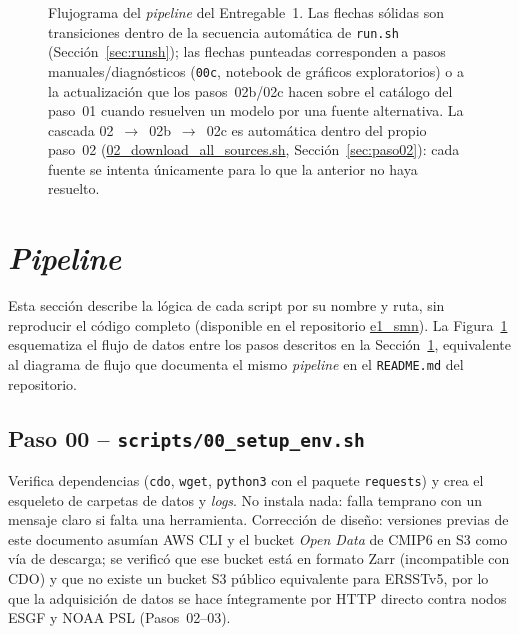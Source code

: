 \documentclass[11pt,a4paper]{article}
\newcommand{\archivo}[1]{\begingroup\hypersetup{urlcolor=black}\url{#1}\endgroup}
\begin{document}
\begin{figure}[htbp]
\begin{tikzpicture}
\end{tikzpicture}
\caption[Flujograma del \emph{pipeline} del Entregable~1.]{Flujograma del \emph{pipeline} del Entregable~1. Las flechas s\'olidas son transiciones dentro de la secuencia autom\'atica de \texttt{run.sh} (Secci\'on~\ref{sec:runsh}); las flechas punteadas corresponden a pasos manuales/diagn\'osticos (\texttt{00c}, notebook de gr\'aficos exploratorios) o a la actualizaci\'on que los pasos~02b/02c hacen sobre el cat\'alogo del paso~01 cuando resuelven un modelo por una fuente alternativa. La cascada 02~$\to$~02b~$\to$~02c es autom\'atica dentro del propio paso~02 (\archivo{02_download_all_sources.sh}, Secci\'on~\ref{sec:paso02}): cada fuente se intenta \'unicamente para lo que la anterior no haya resuelto.}
\label{fig:flujograma}
\end{figure}

\section{\emph{Pipeline}}
\label{sec:scripts}

Esta secci\'on describe la l\'ogica de cada script por su nombre y ruta, sin reproducir el c\'odigo completo (disponible en el repositorio \archivo{e1_smn}).
La Figura~\ref{fig:flujograma} esquematiza el flujo de datos entre los pasos descritos en la Secci\'on~\ref{sec:scripts}, equivalente al diagrama de flujo que documenta el mismo \emph{pipeline} en el \texttt{README.md} del repositorio.


\subsection{Paso 00 -- \texttt{scripts/00\_setup\_env.sh}}
Verifica dependencias (\texttt{cdo}, \texttt{wget}, \texttt{python3} con el paquete \texttt{requests}) y crea el esqueleto de carpetas de datos y \emph{logs}. No instala nada: falla temprano con un mensaje claro si falta una herramienta. Correcci\'on de dise\~no: versiones previas de este documento asum\'ian AWS CLI y el bucket \emph{Open Data} de CMIP6 en S3 como v\'ia de descarga; se verific\'o que ese bucket est\'a en formato Zarr (incompatible con CDO) y que no existe un bucket S3 p\'ublico equivalente para ERSSTv5, por lo que la adquisici\'on de datos se hace \'integramente por HTTP directo contra nodos ESGF y NOAA PSL (Pasos~02--03).
\end{document}
